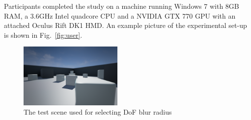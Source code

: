 %
%


Participants completed the study on a machine running Windows 7 with 8GB RAM, a 3.6GHz Intel quadcore CPU and a NVIDIA GTX 770 GPU with an attached Oculus Rift DK1 HMD. An example picture of the experimental set-up is shown in Fig.~\ref{fig:user}. 
\\

\begin{figure}[h!]
        \centering
            \includegraphics[width=0.45\textwidth]{images/testScene.png}
            \caption{The test scene used for selecting DoF blur radius}
            \label{fig:testScene}
\end{figure}

